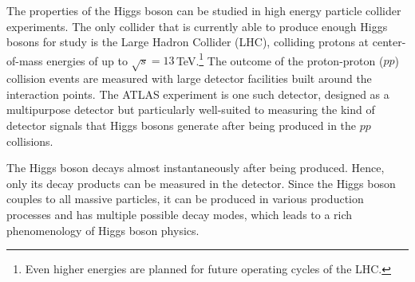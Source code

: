 
The properties of the Higgs boson can be studied in high energy particle collider experiments. 
The only collider that is currently able to produce enough Higgs bosons for study is the Large Hadron Collider (LHC), colliding protons at center-of-mass energies of up to $\sqrt{s} = 13\,$TeV.\footnote{Even higher energies are planned for future operating cycles of the LHC.}
The outcome of the proton-proton ($pp$) collision events are measured with large detector facilities built around the interaction points. 
The ATLAS experiment is one such detector, designed as a multipurpose detector but particularly well-suited to measuring the kind of detector signals that Higgs bosons generate after being produced in the $pp$ collisions.

The Higgs boson decays almost instantaneously after being produced. Hence, only its decay products can be measured in the detector. Since the Higgs boson couples to all massive particles, it can be produced in various production processes and has multiple possible decay modes, which leads to a rich phenomenology of Higgs boson physics. 

